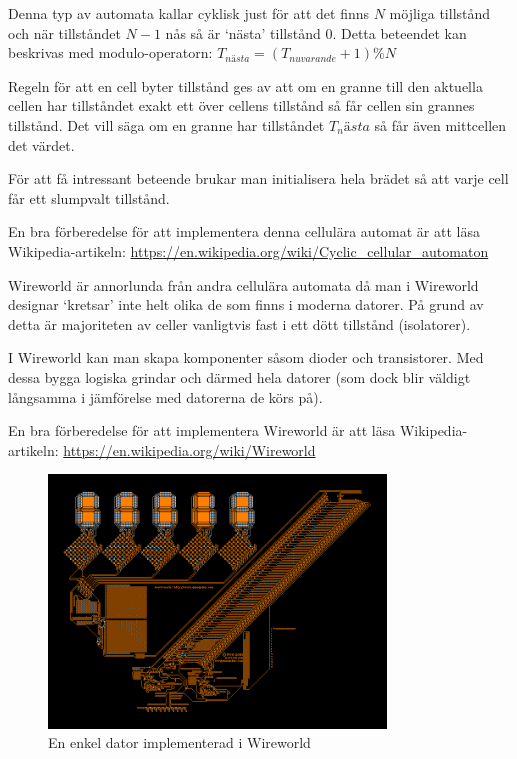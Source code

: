        Denna typ av automata kallar cyklisk just för att det finns $N$ möjliga tillstånd och när tillståndet $N-1$ nås så är `nästa' tillstånd $0$.
        Detta beteendet kan beskrivas med modulo-operatorn: $T_{nästa} = (T_{nuvarande} + 1) \% N$

        Regeln för att en cell byter tillstånd ges av att om en granne till den aktuella cellen har tillståndet exakt ett över cellens tillstånd så får cellen sin grannes tillstånd. Det vill säga om en granne har tillståndet $T_nästa$ så får även mittcellen det värdet.

        För att få intressant beteende brukar man initialisera hela brädet så att varje cell får ett slumpvalt tillstånd.

        En bra förberedelse för att implementera denna cellulära automat är att läsa Wikipedia-artikeln: \url{https://en.wikipedia.org/wiki/Cyclic_cellular_automaton}


        Wireworld är annorlunda från andra cellulära automata då man i Wireworld designar `kretsar' inte helt olika de som finns i moderna datorer.
        På grund av detta är majoriteten av celler vanligtvis fast i ett dött tillstånd (isolatorer).

        I Wireworld kan man skapa komponenter såsom dioder och transistorer. Med dessa bygga logiska grindar och därmed hela datorer (som dock blir väldigt långsamma i jämförelse med datorerna de körs på).

        En bra förberedelse för att implementera Wireworld är att läsa Wikipedia-artikeln: \url{https://en.wikipedia.org/wiki/Wireworld}

        \begin{figure}[h]
            \begin{center}
                \includegraphics[width=0.8\textwidth]{../img/w12-lab/wireworld_computer.png}
            \end{center}
            \caption{En enkel dator implementerad i Wireworld\protect\footnotemark}
        \end{figure}


